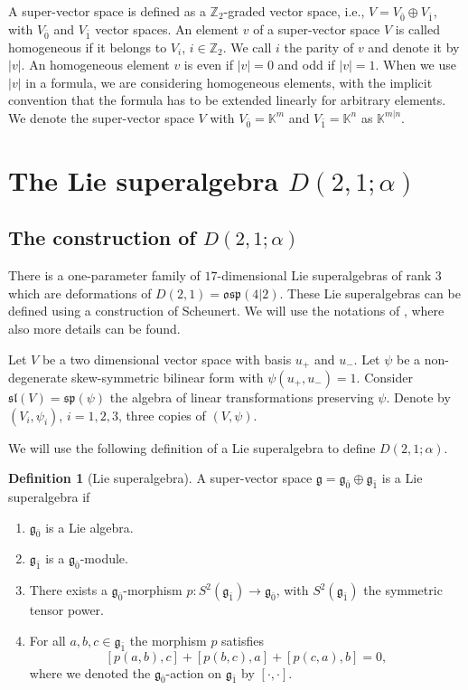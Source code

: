 \documentclass{amsart}
\numberwithin{theorem}{section}
\theoremstyle{definition}
\newtheorem{Def}[theorem]{Definition}
\theoremstyle{remark}
\def\Z{\mathds{Z} }
\newcommand{\ds}[1]{\mathds{#1}}
\newcommand{\g}{{\mathfrak{g}}}
\newcommand{\oa}{\bar{0}}
\newcommand{\ob}{\bar{1}}
\begin{document}
A super-vector space is defined as a $\Z_2$-graded vector space, i.e., $V=V_{\oa}\oplus V_{\ob}$, with $V_{\oa}$ and $V_{\ob}$ vector spaces. An element $v$ of a super-vector space $V$ is called homogeneous if it belongs to $V_i$, $i\in \Z_2$. We call $i$ the parity of $v$ and denote it by $|v|$. An homogeneous element $v$ is even if $|v|=0$ and odd if $|v|=1$. When we use $|v|$ in a formula, we are considering homogeneous elements, with the implicit convention that the formula has to be extended linearly for arbitrary elements. We denote the super-vector space $V$ with $V_{\oa} = \ds K^m$ and $V_{\ob} = \ds K^n$ as $\ds K^{m|n}$. 

\section{The Lie superalgebra $D(2,1;\alpha)$} \label{D(2,1,alpha)}
\subsection{The construction of $D(2,1;\alpha)$}

There is a one-parameter family of $17$-dimensional Lie superalgebras of rank $3$ which are deformations of $D(2,1)=\mathfrak{osp}(4|2)$. These Lie superalgebras can be defined using a construction of Scheunert. We will use the notations of \cite{Mu}, where also more details can be found. 

Let $V$ be a two dimensional vector space with basis $u_{+}$ and $u_-$. Let $\psi$ be a non-degenerate skew-symmetric bilinear form with $\psi(u_+,u_-)=1$. Consider $\mathfrak{sl}(V)= \mathfrak{sp}(\psi)$ the algebra of linear transformations preserving $\psi$. Denote by $(V_i, \psi_i)$, $i=1,2,3$,  three copies of $(V,\psi)$. 

We will use the following definition of a Lie superalgebra to define $D(2,1;\alpha)$.
\begin{Def}[Lie superalgebra]
A super-vector space $\g=\g_{\oa}\oplus \g_{\ob}$ is a Lie superalgebra if
\begin{enumerate}
\item $\g_{\oa}$ is a Lie algebra.
\item $\g_{\ob}$ is a $\g_{\oa}$-module.
\item There exists a $\g_{\oa}$-morphism $p:S^2(\g_{\ob})\rightarrow \g_{\oa}$, with $S^2(\g_{\ob})$ the symmetric tensor power.
\item For all $a,b,c \in \g_{\ob}$ the morphism $p$ satisfies \[ [p(a,b),c]+[p(b,c),a]+[p(c,a),b]=0, \] where we denoted the $\g_{\oa}$-action on $\g_{\ob}$ by $[\cdot,\cdot]$. \label{Jacobi identity}
\end{enumerate}
\end{Def}
\end{document}
